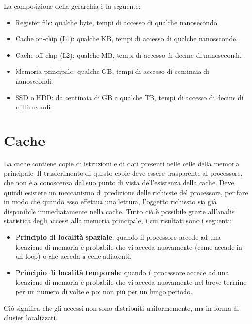 \documentclass[11pt,4paper]{report}
\begin{document}
La composizione della gerarchia è la seguente:
\begin{itemize}
\item Register file: qualche byte, tempi di accesso di qualche nanosecondo.
\item Cache on-chip (L1): qualche KB, tempi di accesso di qualche nanosecondo.
\item Cache off-chip (L2): qualche MB, tempi di accesso di decine di nanosecondi.
\item Memoria principale: qualche GB, tempi di accesso di centinaia di nanosecondi.
\item SSD o HDD: da centinaia di GB a qualche TB, tempi di accesso di decine di millisecondi.
\end{itemize}

\section{Cache}
La cache contiene copie di istruzioni e di dati presenti nelle celle della memoria principale. Il trasferimento di questo copie deve essere trasparente al processore, che non è a conoscenza dal suo punto di vista dell'esistenza della cache. Deve quindi esistere un meccanismo di predizione delle richieste del processore, per fare in modo che quando esso effettua una lettura, l'oggetto richiesto sia già disponibile immediatamente nella cache. Tutto ciò è possibile grazie all'analisi statistica degli accessi alla memoria principale, i cui risultati sono i seguenti:
\begin{itemize}
\item \textbf{Principio di località spaziale}: quando il processore accede ad una locazione di memoria è probabile che vi acceda nuovamente (come accade in un loop) o che acceda a celle adiacenti.
\item \textbf{Principio di località temporale}: quando il processore accede ad una locazione di memoria è probabile che vi acceda nuovamente nel breve termine per un numero di volte e poi non più per un lungo periodo.
\end{itemize}
Ciò significa che gli accessi non sono distribuiti uniformemente, ma in forma di cluster localizzati.
\end{document}
